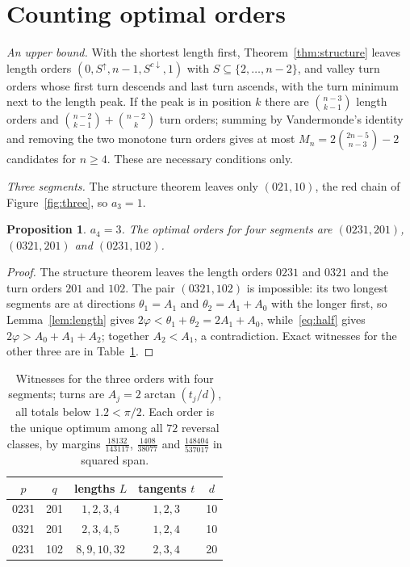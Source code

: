 \documentclass[11pt]{article}
\newtheorem{proposition}[lemma]{Proposition}
\theoremstyle{remark}
\begin{document}
\section{Counting optimal orders}\label{sec:counting}

\emph{An upper bound.} With the shortest length first, Theorem~\ref{thm:structure} leaves length orders $(0,S^{\uparrow},n-1,S^{c\downarrow},1)$ with $S\subseteq\{2,\dots,n-2\}$, and valley turn orders whose first turn descends and last turn ascends, with the turn minimum next to the length peak. If the peak is in position $k$ there are $\binom{n-3}{k-1}$ length orders and $\binom{n-2}{k-1}+\binom{n-2}{k}$ turn orders; summing by Vandermonde's identity and removing the two monotone turn orders gives at most $M_n=2\binom{2n-5}{n-3}-2$ candidates for $n\ge4$. These are necessary conditions only.

\emph{Three segments.} The structure theorem leaves only $(021,10)$, the red chain of Figure~\ref{fig:three}, so $a_3=1$.

\begin{proposition}\label{prop:four}
$a_4=3$. The optimal orders for four segments are $(0231,201)$, $(0321,201)$ and $(0231,102)$.
\end{proposition}

\begin{proof}
The structure theorem leaves the length orders $0231$ and $0321$ and the turn orders $201$ and $102$. The pair $(0321,102)$ is impossible: its two longest segments are at directions $\theta_1=A_1$ and $\theta_2=A_1+A_0$ with the longer first, so Lemma~\ref{lem:length} gives $2\varphi<\theta_1+\theta_2=2A_1+A_0$, while~\eqref{eq:half} gives $2\varphi>A_0+A_1+A_2$; together $A_2<A_1$, a contradiction. Exact witnesses for the other three are in Table~\ref{tab:four}.
\end{proof}

\begin{table}[ht]
\centering
\begin{tabular}{ccccc}
\toprule
$p$ & $q$ & lengths $L$ & tangents $t$ & $d$\\
\midrule
0231 & 201 & $1,2,3,4$ & $1,2,3$ & 10\\
0321 & 201 & $2,3,4,5$ & $1,2,4$ & 10\\
0231 & 102 & $8,9,10,32$ & $2,3,4$ & 20\\
\bottomrule
\end{tabular}
\caption{Witnesses for the three orders with four segments; turns are $A_j=2\arctan(t_j/d)$, all totals below $1.2<\pi/2$. Each order is the unique optimum among all $72$ reversal classes, by margins $\frac{18132}{143117}$, $\frac{1408}{38077}$ and $\frac{148404}{537017}$ in squared span.}
\label{tab:four}
\end{table}
\end{document}
